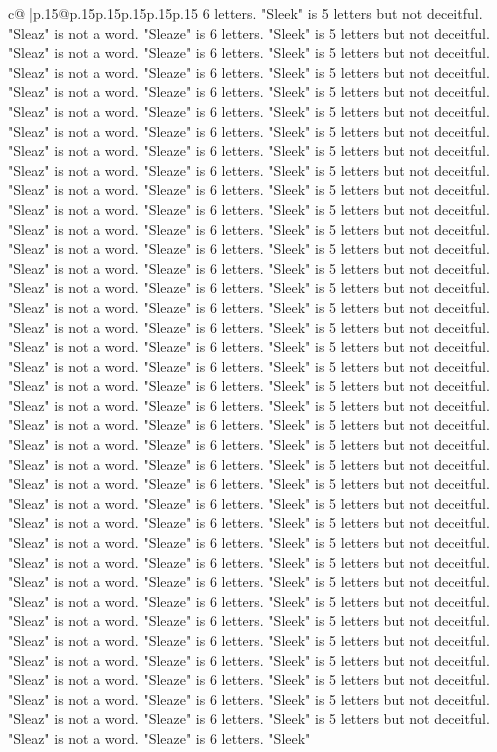 \documentclass{article}
\begin{document}
{\begin{supertabular}{c@{$\;$}|p{.15\linewidth}@{}p{.15\linewidth}p{.15\linewidth}p{.15\linewidth}p{.15\linewidth}p{.15\linewidth}}
{{{6 letters. "Sleek" is 5 letters but not deceitful. "Sleaz" is not a word. "Sleaze" is 6 letters. "Sleek" is 5 letters but not deceitful. "Sleaz" is not a word. "Sleaze" is 6 letters. "Sleek" is 5 letters but not deceitful. "Sleaz" is not a word. "Sleaze" is 6 letters. "Sleek" is 5 letters but not deceitful. "Sleaz" is not a word. "Sleaze" is 6 letters. "Sleek" is 5 letters but not deceitful. "Sleaz" is not a word. "Sleaze" is 6 letters. "Sleek" is 5 letters but not deceitful. "Sleaz" is not a word. "Sleaze" is 6 letters. "Sleek" is 5 letters but not deceitful. "Sleaz" is not a word. "Sleaze" is 6 letters. "Sleek" is 5 letters but not deceitful. "Sleaz" is not a word. "Sleaze" is 6 letters. "Sleek" is 5 letters but not deceitful. "Sleaz" is not a word. "Sleaze" is 6 letters. "Sleek" is 5 letters but not deceitful. "Sleaz" is not a word. "Sleaze" is 6 letters. "Sleek" is 5 letters but not deceitful. "Sleaz" is not a word. "Sleaze" is 6 letters. "Sleek" is 5 letters but not deceitful. "Sleaz" is not a word. "Sleaze" is 6 letters. "Sleek" is 5 letters but not deceitful. "Sleaz" is not a word. "Sleaze" is 6 letters. "Sleek" is 5 letters but not deceitful. "Sleaz" is not a word. "Sleaze" is 6 letters. "Sleek" is 5 letters but not deceitful. "Sleaz" is not a word. "Sleaze" is 6 letters. "Sleek" is 5 letters but not deceitful. "Sleaz" is not a word. "Sleaze" is 6 letters. "Sleek" is 5 letters but not deceitful. "Sleaz" is not a word. "Sleaze" is 6 letters. "Sleek" is 5 letters but not deceitful. "Sleaz" is not a word. "Sleaze" is 6 letters. "Sleek" is 5 letters but not deceitful. "Sleaz" is not a word. "Sleaze" is 6 letters. "Sleek" is 5 letters but not deceitful. "Sleaz" is not a word. "Sleaze" is 6 letters. "Sleek" is 5 letters but not deceitful. "Sleaz" is not a word. "Sleaze" is 6 letters. "Sleek" is 5 letters but not deceitful. "Sleaz" is not a word. "Sleaze" is 6 letters. "Sleek" is 5 letters but not deceitful. "Sleaz" is not a word. "Sleaze" is 6 letters. "Sleek" is 5 letters but not deceitful. "Sleaz" is not a word. "Sleaze" is 6 letters. "Sleek" is 5 letters but not deceitful. "Sleaz" is not a word. "Sleaze" is 6 letters. "Sleek" is 5 letters but not deceitful. "Sleaz" is not a word. "Sleaze" is 6 letters. "Sleek" is 5 letters but not deceitful. "Sleaz" is not a word. "Sleaze" is 6 letters. "Sleek" is 5 letters but not deceitful. "Sleaz" is not a word. "Sleaze" is 6 letters. "Sleek" is 5 letters but not deceitful. "Sleaz" is not a word. "Sleaze" is 6 letters. "Sleek" is 5 letters but not deceitful. "Sleaz" is not a word. "Sleaze" is 6 letters. "Sleek" is 5 letters but not deceitful. "Sleaz" is not a word. "Sleaze" is 6 letters. "Sleek" is 5 letters but not deceitful. "Sleaz" is not a word. "Sleaze" is 6 letters. "Sleek" is 5 letters but not deceitful. "Sleaz" is not a word. "Sleaze" is 6 letters. "Sleek" is 5 letters but not deceitful. "Sleaz" is not a word. "Sleaze" is 6 letters. "Sleek" is 5 letters but not deceitful. "Sleaz" is not a word. "Sleaze" is 6 letters. "Sleek" is 5 letters but not deceitful. "Sleaz" is not a word. "Sleaze" is 6 letters. "Sleek" is 5 letters but not deceitful. "Sleaz" is not a word. "Sleaze" is 6 letters. "Sleek" }}}
\end{supertabular}}
\end{document}
